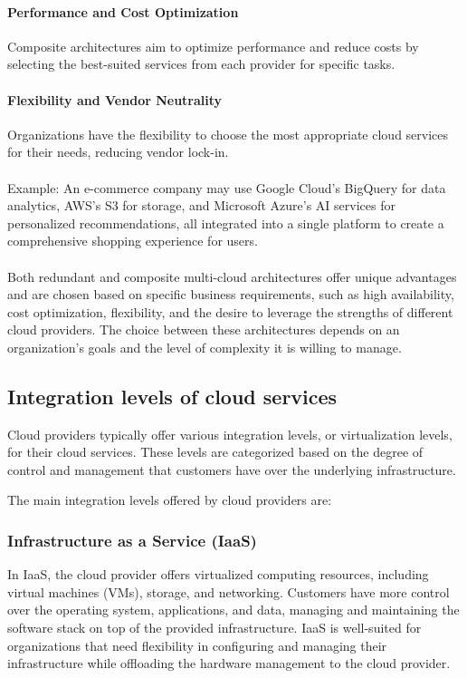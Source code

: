 \paragraph{Performance and Cost Optimization} 
Composite architectures aim to optimize performance and 
reduce costs by selecting the best-suited services from each provider for specific tasks.

\paragraph{Flexibility and Vendor Neutrality}
Organizations have the flexibility to choose the most appropriate cloud services for their needs, reducing vendor lock-in.
\\\\
Example: An e-commerce company may use Google Cloud's BigQuery for data analytics, AWS's S3 for storage, and Microsoft Azure's AI services for personalized recommendations, all integrated into a single platform to create a comprehensive shopping experience for users.
\\\\
Both redundant and composite multi-cloud architectures offer unique advantages and are chosen based on specific business requirements, such as high availability, cost optimization, flexibility, and the desire to leverage the strengths of different cloud providers. The choice between these architectures depends on an organization's goals and the level of complexity it is willing to manage.


\subsection{Integration levels of cloud services}

Cloud providers typically offer various integration levels, or virtualization levels, for their cloud services. 
These levels are categorized based on the degree of control and management that customers have over the underlying infrastructure. 

The main integration levels offered by cloud providers are:

\subsubsection{Infrastructure as a Service (IaaS)}
In IaaS, the cloud provider offers virtualized computing resources, including virtual machines (VMs), storage, and networking.
Customers have more control over the operating system, applications, and data, managing and maintaining the software stack on top of the provided infrastructure.
IaaS is well-suited for organizations that need flexibility in configuring and managing their infrastructure while offloading the hardware management to the cloud provider.

